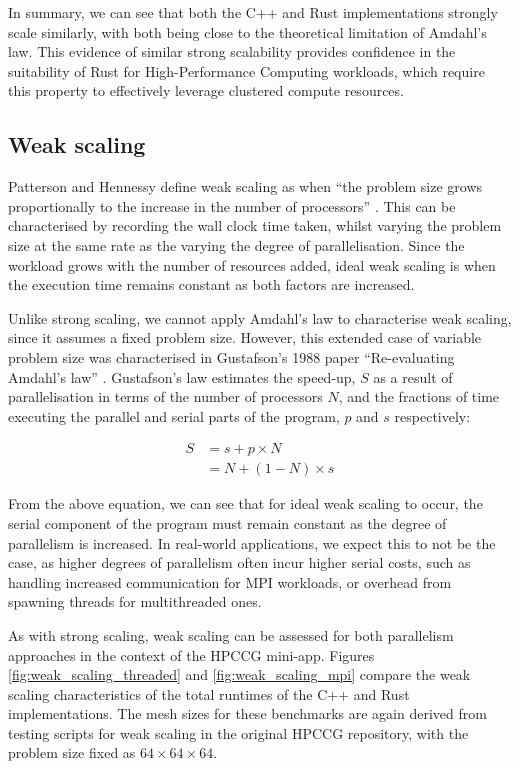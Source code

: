In summary, we can see that both the C++ and Rust implementations strongly scale similarly, with both being close to the theoretical limitation of Amdahl's law. This evidence of similar strong scalability provides confidence in the suitability of Rust for High-Performance Computing workloads, which require this property to effectively leverage clustered compute resources.

\subsection{Weak scaling}
\label{ssec:weak-scaling}

Patterson and Hennessy define weak scaling as when ``the problem size grows proportionally to the increase in the number of processors'' \cite{pattersonHennessyComputerOrganisationArchitecture}. This can be characterised by recording the wall clock time taken, whilst varying the problem size at the same rate as the varying the degree of parallelisation. Since the workload grows with the number of resources added, ideal weak scaling is when the execution time remains constant as both factors are increased.

Unlike strong scaling, we cannot apply Amdahl's law to characterise weak scaling, since it assumes a fixed problem size. However, this extended case of variable problem size was characterised in Gustafson's 1988 paper ``Re-evaluating Amdahl's law'' \cite{gustafsonReevaluatingAmdahlLaw1988}. Gustafson's law estimates the speed-up, $S$ as a result of parallelisation in terms of the number of processors $N$, and the fractions of time executing the parallel and serial parts of the program, $p$ and $s$ respectively:

\begin{align}
    S &= s + p \times N \\
      &= N + (1 - N) \times s
\end{align}

From the above equation, we can see that for ideal weak scaling to occur, the serial component of the program must remain constant as the degree of parallelism is increased. In real-world applications, we expect this to not be the case, as higher degrees of parallelism often incur higher serial costs, such as handling increased communication for MPI workloads, or overhead from spawning threads for multithreaded ones.

As with strong scaling, weak scaling can be assessed for both parallelism approaches in the context of the HPCCG mini-app. Figures \ref{fig:weak_scaling_threaded} and \ref{fig:weak_scaling_mpi} compare the weak scaling characteristics of the total runtimes of the C++ and Rust implementations. The mesh sizes for these benchmarks are again derived from testing scripts for weak scaling in the original HPCCG repository, with the problem size fixed as $64 \times 64 \times 64$.

